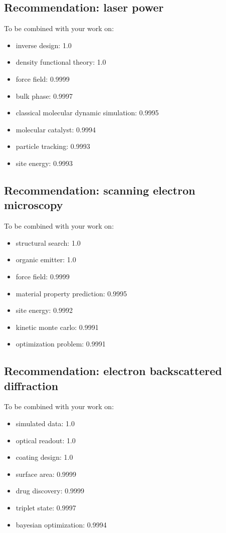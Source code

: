 \documentclass{article}%
\begin{document}
\subsection{Recommendation: laser power}%
\label{subsec:Recommendationlaserpower}%
To be combined with your work on:%
\begin{itemize}%
\item%
inverse design: 1.0%
\item%
density functional theory: 1.0%
\item%
force field: 0.9999%
\item%
bulk phase: 0.9997%
\item%
classical molecular dynamic simulation: 0.9995%
\item%
molecular catalyst: 0.9994%
\item%
particle tracking: 0.9993%
\item%
site energy: 0.9993%
\end{itemize}

%
\subsection{Recommendation: scanning electron microscopy}%
\label{subsec:Recommendationscanningelectronmicroscopy}%
To be combined with your work on:%
\begin{itemize}%
\item%
structural search: 1.0%
\item%
organic emitter: 1.0%
\item%
force field: 0.9999%
\item%
material property prediction: 0.9995%
\item%
site energy: 0.9992%
\item%
kinetic monte carlo: 0.9991%
\item%
optimization problem: 0.9991%
\end{itemize}

%
\subsection{Recommendation: electron backscattered diffraction}%
\label{subsec:Recommendationelectronbackscattereddiffraction}%
To be combined with your work on:%
\begin{itemize}%
\item%
simulated data: 1.0%
\item%
optical readout: 1.0%
\item%
coating design: 1.0%
\item%
surface area: 0.9999%
\item%
drug discovery: 0.9999%
\item%
triplet state: 0.9997%
\item%
bayesian optimization: 0.9994%
\end{itemize}
\end{document}
